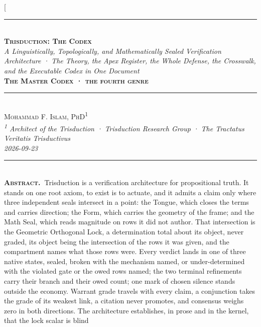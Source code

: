 \documentclass[10pt,twocolumn]{article}
\begin{document}
\twocolumn[{%
\begin{center}
{\color{accent}\rule{0.6\textwidth}{0.8pt}}\\[10pt]
{\bfseries\scshape\fontsize{20}{23}\selectfont Trisduction: The
Codex}\\[7pt]
{\itshape\large A Linguistically, Topologically, and Mathematically
Sealed Verification Architecture · The Theory, the Apex Register, the
Whole Defense, the Crosswalk, and the Executable Codex in One
Document}\\[8pt]
{\footnotesize\color{accent}\scshape\bfseries The Master Codex · the
fourth genre}\\[3pt]

{\color{accent}\rule{0.6\textwidth}{0.8pt}}\\[10pt]
{\scshape Mohammad F. Islam, PhD\textsuperscript{1}}\\[2pt]
{\itshape\color{faint}\small \textsuperscript{1} Architect of the
Trisduction · Trisduction Research Group · The Tractatus Veritatis
Trisductivus}\\[2pt]
{\itshape\color{faint}\small 2026-09-23}\\[14pt]
\end{center}
\begin{minipage}{\textwidth}
{\color{accent}\rule{\textwidth}{0.6pt}}\\[4pt]
{\small\hspace{1em}\textbf{\scshape\color{deep}Abstract.\ }Trisduction
is a verification architecture for propositional truth. It stands on one
root axiom, to exist is to actuate, and it admits a claim only where
three independent seals intersect in a point: the Tongue, which closes
the terms and carries direction; the Form, which carries the geometry of
the frame; and the Math Seal, which reads magnitude on rows it did not
author. That intersection is the Geometric Orthogonal Lock, a
determination total about its object, never graded, its object being the
intersection of the rows it was given, and the compartment names what
those rows were. Every verdict lands in one of three native states,
sealed, broken with the mechanism named, or under-determined with the
violated gate or the owed rows named; the two terminal refinements carry
their branch and their owed count; one mark of chosen silence stands
outside the economy. Warrant grade travels with every claim, a
conjunction takes the grade of its weakest link, a citation never
promotes, and consensus weighs zero in both directions. The architecture
establishes, in prose and in the kernel, that the lock scalar is blind
}
\end{minipage}}
\end{document}
